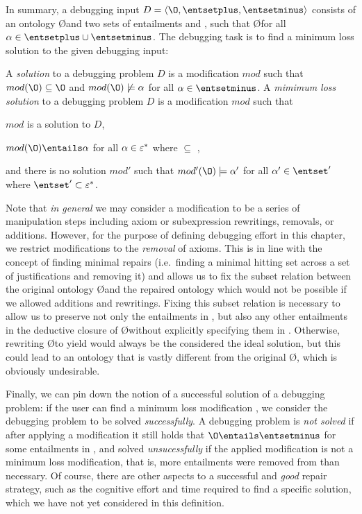 In summary, a debugging input $D = \langle \O,  \entsetplus, \entsetminus \rangle$ consists of an ontology \O and two sets of entailments \entsetplus and \entsetminus, such that \O \entails \axiom for all $\alpha \in \entsetplus \cup \entsetminus$. The debugging task is to find a minimum loss solution to the given debugging input:

\begin{defn}
A \emph{solution} to a debugging problem $D$ is a modification $mod$ such that $mod(\O) \subseteq \O$ and $mod(\O) \not\models \alpha$ for all $ \alpha \in \entsetminus$. A \emph{mimimum loss solution} to a debugging problem $D$ is a modification $mod$ such that 
\begin{compactitem}
\item $mod$ is a solution to $D$,
\item $mod(\O) \entails \alpha$ for all $\alpha \in \varepsilon^{*}$ where \entsetstar $\subseteq$ \entsetplus, 
\item and there is no solution $mod'$ such that $mod'(\O) \models \alpha'$ for all $\alpha' \in \entset'$ where $\entset' \subset \entsetstar$.
\end{compactitem}
\end{defn}

Note that \emph{in general} we may consider a modification \modif to be a series of manipulation steps including axiom or subexpression rewritings, removals, or additions. However, for the purpose of defining debugging effort in this chapter, we restrict modifications to the \emph{removal} of axioms. This is in line with the concept of finding minimal repairs (i.e.\ finding a minimal hitting set across a set of justifications and removing it) and allows us to fix the subset relation between the original ontology \O and the repaired ontology \oprime which would not be possible if we allowed additions and rewritings. Fixing this subset relation is necessary to allow us to preserve not only the entailments in \entsetplus, but also any other entailments in the deductive closure of \O without explicitly specifying them in \entsetplus. Otherwise, rewriting \O to yield \entsetplus would always be the considered the ideal solution, but this could lead to an ontology that is vastly different from the original \O, which is obviously undesirable.

Finally, we can pin down the notion of a successful solution of a debugging problem: if the user can find a minimum loss modification \modif, we consider the debugging problem to be solved \emph{successfully}. A debugging problem is \emph{not solved} if after applying a modification it still holds that  $\O \entails \entsetminus$ for some entailments in \entsetminus, and solved \emph{unsucessfully} if the applied modification is not a minimum loss modification, that is, more entailments were removed from \entsetplus than necessary. Of course, there are other aspects to a successful and \emph{good} repair strategy, such as the cognitive effort and time required to find a specific solution, which we have not yet considered in this definition.


